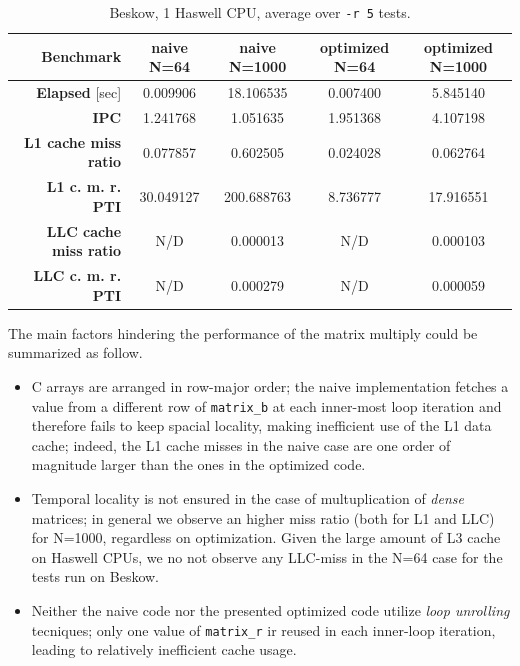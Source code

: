 \documentclass[a4paper]{article}
\begin{document}
\begin{table}
\begin{center}
\begin{tabular}{ r||c|c|c|c| } 
 \hline
 \textbf{Benchmark} & naive N=64 & naive N=1000 & optimized N=64 & optimized N=1000 \\
 \hline
 \hline
 \textbf{Elapsed} [sec]	& 0.009906 & 18.106535 & 0.007400 & 5.845140 \\
 \textbf{IPC} & 1.241768 & 1.051635	& 1.951368 & 4.107198 \\
 \textbf{L1 cache miss ratio} & 0.077857 & 0.602505	& 0.024028 & 0.062764 \\
 \textbf{L1 c. m. r. PTI} & 30.049127 & 200.688763 & 8.736777	& 17.916551 \\ 
 \textbf{LLC cache miss ratio} & N/D & 0.000013 & N/D & 0.000103 \\
 \textbf{LLC c. m. r. PTI} & N/D & 0.000279	& N/D & 0.000059 \\
 \hline
\end{tabular}
\caption{Beskow, 1 Haswell CPU, average over \texttt{-r 5} tests.}
\label{table:perf_beskow}
\end{center}
\end{table}

The main factors hindering the performance of the matrix multiply could be summarized as follow.
\begin{itemize}
    \item C arrays are arranged in row-major order; the naive implementation fetches a value from a different row of \texttt{matrix\_b} at each inner-most loop iteration and therefore fails to keep spacial locality, making inefficient use of the L1 data cache; indeed, the L1 cache misses in the naive case are one order of magnitude larger than the ones in the optimized code.
    \item Temporal locality is not ensured in the case of multuplication of \textit{dense} matrices; in general we observe an higher miss ratio (both for L1 and LLC) for N=1000, regardless on optimization. Given the large amount of L3 cache on Haswell CPUs, we no not observe any LLC-miss in the N=64 case for the tests run on Beskow.
    \item Neither the naive code nor the presented optimized code utilize \textit{loop unrolling} tecniques; only one value of \texttt{matrix\_r} ir reused in each inner-loop iteration, leading to relatively inefficient cache usage.
\end{itemize}
\end{document}
